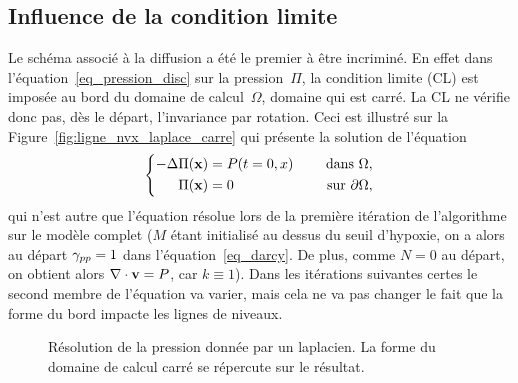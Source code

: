 \documentclass[main.tex]{subfiles}
\begin{document}
\subsection{Influence de la condition limite}
Le schéma associé à la diffusion a été le premier à être incriminé. En effet dans l'équation~\eqref{eq_pression_disc} sur la pression~$\Pi$, la condition limite (CL) est imposée au bord du domaine de calcul~$\Omega$, domaine qui est carré. La CL ne vérifie donc pas, dès le départ, l'invariance par rotation. Ceci est illustré sur la Figure~\ref{fig:ligne_nvx_laplace_carre} qui présente la solution de l'équation
\begin{equation}\label{eq:pression_iter1}
\left\{
\begin{aligned}
-\Delta \Pi(\mathbf{x}) &= P(t=0,x) & \quad \textrm{ dans }  \Omega , \\
\Pi(\mathbf{x}) &=0 & \quad \textrm{ sur  } \partial \Omega,
\end{aligned}
\right.
\end{equation}
qui n'est autre que l'équation résolue lors de la première itération de l'algorithme sur le modèle complet ($M$ étant initialisé au dessus du seuil d'hypoxie, on a alors au départ $\gamma_{pp}=1$ dans l'équation~\eqref{eq_darcy}. De plus, comme $N=0$ au départ, on obtient alors $\nabla\cdot \mathbf{v} = P$, car $k\equiv1$). Dans les itérations suivantes certes le second membre de l'équation va varier, mais cela ne va pas changer le fait que la forme du bord impacte les lignes de niveaux.
\begin{figure}
\centering
{}
\caption{\label{fig:ligne_nvx_laplace} Résolution de la pression donnée par un laplacien. La forme du domaine de calcul carré se répercute sur le résultat.}
\end{figure}
\end{document}
